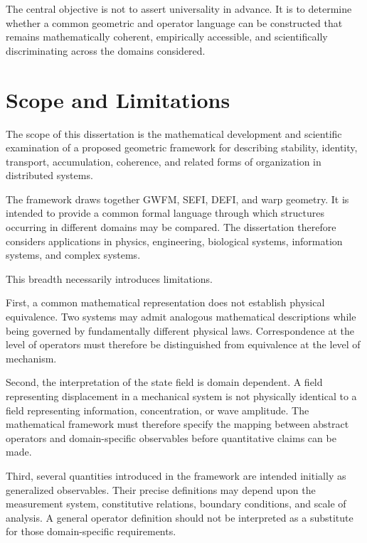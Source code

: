 \documentclass[12pt,oneside]{book}
\begin{document}
The central objective is not to assert universality in advance.
It is to determine whether a common geometric and operator
language can be constructed that remains mathematically
coherent, empirically accessible, and scientifically
discriminating across the domains considered.


\chapter*{Scope and Limitations}

The scope of this dissertation is the mathematical development
and scientific examination of a proposed geometric framework
for describing stability, identity, transport, accumulation,
coherence, and related forms of organization in distributed
systems.

The framework draws together GWFM, SEFI, DEFI, and warp
geometry. It is intended to provide a common formal language
through which structures occurring in different domains may be
compared. The dissertation therefore considers applications in
physics, engineering, biological systems, information systems,
and complex systems.

This breadth necessarily introduces limitations.

First, a common mathematical representation does not establish
physical equivalence. Two systems may admit analogous
mathematical descriptions while being governed by fundamentally
different physical laws. Correspondence at the level of
operators must therefore be distinguished from equivalence at
the level of mechanism.

Second, the interpretation of the state field is domain
dependent. A field representing displacement in a mechanical
system is not physically identical to a field representing
information, concentration, or wave amplitude. The mathematical
framework must therefore specify the mapping between abstract
operators and domain-specific observables before quantitative
claims can be made.

Third, several quantities introduced in the framework are
intended initially as generalized observables. Their precise
definitions may depend upon the measurement system, constitutive
relations, boundary conditions, and scale of analysis. A
general operator definition should not be interpreted as a
substitute for those domain-specific requirements.
\end{document}
